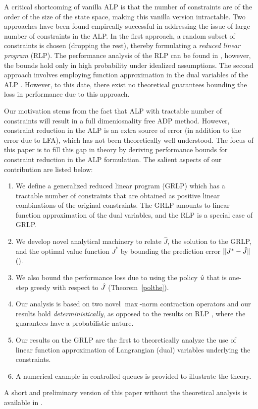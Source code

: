 A critical shortcoming of vanilla ALP is that the number of constraints are of the order of the size of the state space, making this vanilla version intractable. Two approaches have been found empircally successful in addressing the issue of large number of constraints in the ALP. In the first approach, a random subset of constraints is chosen (dropping the rest), thereby formulating a \emph{reduced linear program} (RLP). The performance analysis of the RLP can be found in \cite{CS}, however, the bounds hold only in high probability under idealized assumptions. The second approach involves employing function approximation in the dual variables of the ALP \cite{ALP-Bor,dolgov}. However, to this date, there exist no theoretical guarantees bounding the loss in performance due to this approach.\par
Our motivation stems from the fact that ALP with tractable number of constraints will result in a full dimeniosnality free ADP method. However, constraint reduction in the ALP is an extra source of error (in addition to the error due to LFA), which has not been theoretically well understood.  The focus of this paper is to fill this gap in theory by deriving performance bounds for constraint reduction in the ALP formulation.
The salient aspects of our contribution are listed below:
\begin{enumerate}
\item We define a generalized reduced linear program (GRLP) which has a tractable number of constraints that are obtained as positive linear combinations of the original constraints. The GRLP amounts to linear function approximation of the dual variables, and the RLP is a special case of GRLP.
		\item We develop novel analytical machinery to relate $\hat{J}$, the solution to the GRLP, and the optimal value function $J^*$ by bounding the prediction error $||J^*-\hat{J}||$ (). 
		\item We also bound the performance loss due to using the policy $\hat{u}$ that is one-step greedy with respect to $\hat{J}$ (Theorem~\ref{polthe}).
		\item Our analysis is based on two novel $\max$-norm contraction operators and our results hold \emph{deterministically}, as opposed to the results on RLP \cite{SALP,CS}, where the guarantees have a probabilistic nature.
\item Our results on the GRLP are the first to theoretically analyze the use of linear function approximation of Langrangian (dual) variables underlying the constraints.
\item A numerical example in controlled queues is provided to illustrate the theory.
\end{enumerate}
A short and preliminary version of this paper without the theoretical analysis is available in \cite{aaaipaper}.
